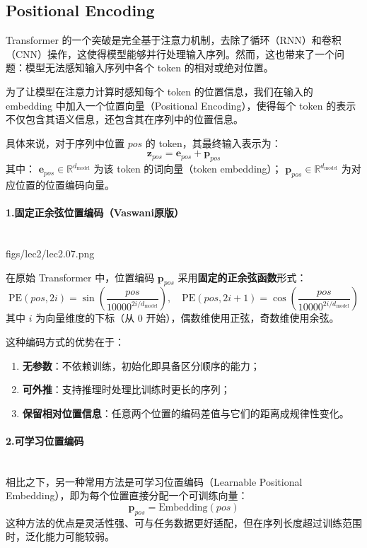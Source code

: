 \clearpage
\subsection{Positional Encoding}
Transformer 的一个突破是完全基于注意力机制，去除了循环（RNN）和卷积（CNN）操作，这使得模型能够并行处理输入序列。然而，这也带来了一个问题：模型无法感知输入序列中各个 token 的相对或绝对位置。

为了让模型在注意力计算时感知每个 token 的位置信息，我们在输入的 embedding 中加入一个位置向量（Positional Encoding），使得每个 token 的表示不仅包含其语义信息，还包含其在序列中的位置信息。

具体来说，对于序列中位置 $pos$ 的 token，其最终输入表示为：
\[
\mathbf{z}_{pos} = \mathbf{e}_{pos} + \mathbf{p}_{pos}
\]
其中：
$\mathbf{e}_{pos} \in \mathbb{R}^{d_{\text{model}}}$ 为该 token 的词向量（token embedding）；
$\mathbf{p}_{pos} \in \mathbb{R}^{d_{\text{model}}}$ 为对应位置的位置编码向量。

\paragraph{1.固定正余弦位置编码（Vaswani原版）}~{}
\\
\MarginImageWithNote
  {figs/lec2/lec2.07.png}
  {}

在原始 Transformer 中，位置编码 $\mathbf{p}_{pos}$ 采用\textbf{固定的正余弦函数}形式：
\[
\text{PE}(pos, 2i) = \sin\left( \frac{pos}{10000^{2i / d_{\text{model}}}} \right), \quad
\text{PE}(pos, 2i+1) = \cos\left( \frac{pos}{10000^{2i / d_{\text{model}}}} \right)
\]
其中 $i$ 为向量维度的下标（从 0 开始），偶数维使用正弦，奇数维使用余弦。

这种编码方式的优势在于：
\begin{enumerate}
  \item \textbf{无参数}：不依赖训练，初始化即具备区分顺序的能力；
  \item \textbf{可外推}：支持推理时处理比训练时更长的序列；
  \item \textbf{保留相对位置信息}：任意两个位置的编码差值与它们的距离成规律性变化。
\end{enumerate}

\paragraph{2.可学习位置编码}~{}
\\
相比之下，另一种常用方法是可学习位置编码（Learnable Positional Embedding），即为每个位置直接分配一个可训练向量：
\[
\mathbf{p}_{pos} = \text{Embedding}(pos)
\]
这种方法的优点是灵活性强、可与任务数据更好适配，但在序列长度超过训练范围时，泛化能力可能较弱。

